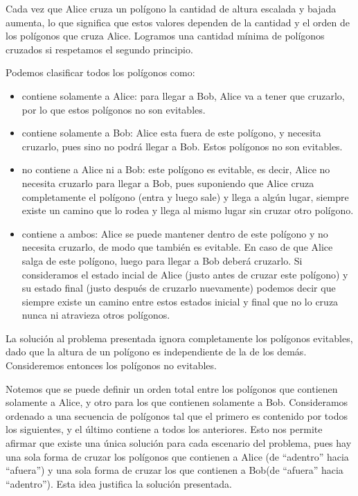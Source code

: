 Cada vez que Alice cruza un polígono la cantidad de altura escalada y bajada aumenta, lo que significa que
estos valores dependen de la cantidad y el orden de los polígonos que cruza Alice. Logramos una cantidad
mínima de polígonos cruzados si respetamos el segundo principio.

Podemos clasificar todos los polígonos como:
\begin{itemize}
\item contiene solamente a Alice: para llegar a Bob, Alice va a tener que cruzarlo, por lo que estos
polígonos no son evitables.
\item contiene solamente a Bob: Alice esta fuera de este polígono, y necesita cruzarlo, pues sino no podrá
llegar a Bob. Estos polígonos no son evitables.
\item no contiene a Alice ni a Bob: este polígono es evitable, es decir, Alice no necesita cruzarlo para
llegar a Bob, pues suponiendo que Alice cruza completamente el polígono (entra y luego sale) y llega a
algún lugar, siempre existe un camino que lo rodea y llega al mismo lugar sin cruzar otro polígono.
\item contiene a ambos: Alice se puede mantener dentro de este polígono y no necesita cruzarlo, de modo
que también es evitable. En caso de que Alice salga de este polígono, luego para llegar a Bob deberá
cruzarlo. Si consideramos el estado incial de Alice (justo antes de cruzar este polígono) y su estado
final (justo después de cruzarlo nuevamente) podemos decir que siempre existe un camino entre estos estados
inicial y final que no lo cruza nunca ni atravieza otros polígonos.
\end{itemize}

La solución al problema presentada ignora completamente los polígonos evitables, dado que la altura de un
polígono es independiente de la de los demás. Consideremos entonces los polígonos no evitables.

Notemos que se puede definir un orden total entre los polígonos que contienen solamente a Alice, y otro
para los que contienen solamente a Bob. Consideramos ordenado a una secuencia de polígonos tal que el
primero es contenido por todos los siguientes, y el último contiene a todos los anteriores. Esto nos
permite afirmar que existe una única solución para cada escenario del problema, pues hay una sola forma de
cruzar los polígonos que contienen a Alice (de ``adentro'' hacia ``afuera'') y una sola forma de cruzar los
que contienen a Bob(de ``afuera'' hacia ``adentro''). Esta idea justifica la solución presentada.

